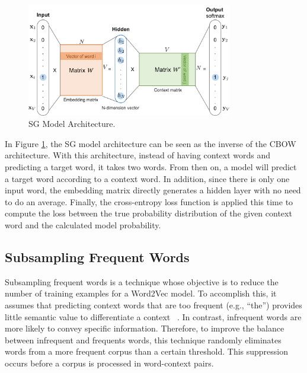 \begin{figure}[!ht]
  \centering
  \includegraphics[width=0.8\textwidth]{img/embedders/w2v/skip-gram}
  \caption{SG Model Architecture.}
  \label{fig:w2v:sg:architecture}
\end{figure}

In Figure \ref{fig:w2v:sg:architecture}, the SG model architecture can be seen
as the inverse of the CBOW architecture. With this architecture, instead of
having context words and predicting a target word, it takes two words. From then
on, a model will predict a target word according to a context word. In addition,
since there is only one input word, the embedding matrix directly generates a
hidden layer with no need to do an average. Finally, the cross-entropy loss
function is applied this time to compute the loss between the true probability
distribution of the given context word and the calculated model probability.

\subsection{Subsampling Frequent Words}
\label{subsec:w2v:sfw}

Subsampling frequent words is a technique whose objective is to reduce the
number of training examples for a Word2Vec model. To accomplish this, it assumes
that predicting context words that are too frequent (e.g., ``the'') provides
little semantic value to differentiate a context
~\citep{inproceedings:mikolov}. In contrast, infrequent words are more likely to
convey specific information. Therefore, to improve the balance between
infrequent and frequents words, this technique randomly eliminates words from a
more frequent corpus than a certain threshold. This suppression occurs before a
corpus is processed in word-context pairs.

